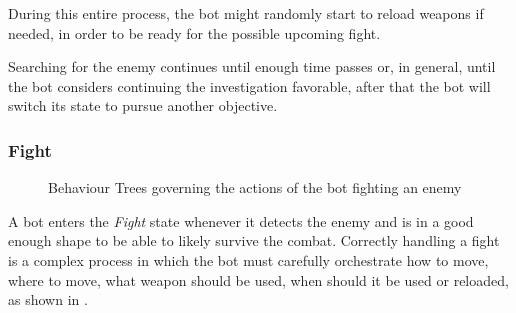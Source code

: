 During this entire process, the bot might randomly start to reload weapons if needed, in order to be ready for the possible upcoming fight.

Searching for the enemy continues until enough time passes or, in general, until the bot considers continuing the investigation favorable, after that the bot will switch its state to pursue another objective.

\subsubsection{Fight}

\begin{figure}
\centering
\captionsetup[subfigure]{}

\caption{Behaviour Trees governing the actions of the bot fighting an enemy}
\label{fig:fight_bt}
\end{figure}

A bot enters the \textit{Fight} state whenever it detects the enemy and is in a good enough shape to be able to likely survive the combat.
Correctly handling a fight is a complex process in which the bot must carefully orchestrate how to move, where to move, what weapon should be used, when should it be used or reloaded, as shown in .

